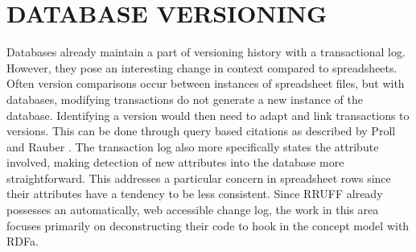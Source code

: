 
\chapter{DATABASE VERSIONING}

Databases already maintain a part of versioning history with a transactional log.
However, they pose an interesting change in context compared to spreadsheets.
Often version comparisons occur between instances of spreadsheet files, but with databases, modifying transactions do not generate a new instance of the database.
Identifying a version would then need to adapt and link transactions to versions.
This can be done through query based citations as described by Proll and Rauber \cite{Proell2013}.
The transaction log also more specifically states the attribute involved, making detection of new attributes into the database more straightforward.
This addresses a particular concern in spreadsheet rows since their attributes have a tendency to be less consistent.
Since RRUFF already possesses an automatically, web accessible change log, the work in this area focuses primarily on deconstructing their code to hook in the concept model with RDFa.